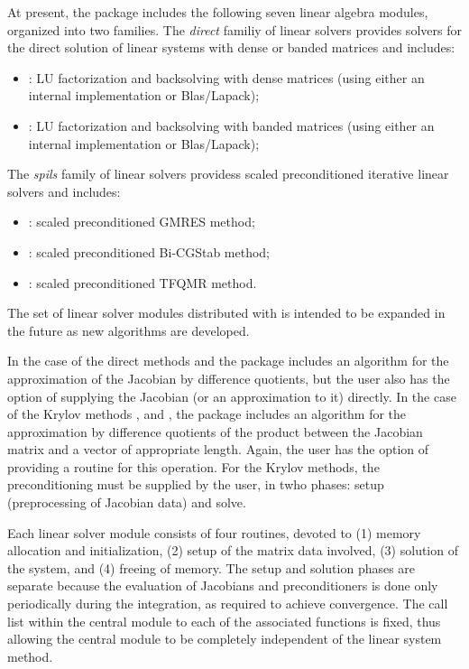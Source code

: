 At present, the package includes the following seven {\kinsol} linear algebra
modules, organized into two families. The {\em direct} familiy of linear
solvers provides solvers for the direct solution of linear systems with
dense or banded matrices and includes:
\begin{itemize} 
\item {\kindense}: LU factorization and backsolving with dense matrices
  (using either an internal implementation or Blas/Lapack); 
\item {\kinband}: LU factorization and backsolving with banded matrices
  (using either an internal implementation or Blas/Lapack); 
\end{itemize}
The {\em spils} family of linear solvers providess scaled preconditioned
iterative linear solvers and includes:
\begin{itemize} 
\item {\kinspgmr}: scaled preconditioned GMRES method;
\item {\kinspbcg}: scaled preconditioned Bi-CGStab method;
\item {\kinsptfqmr}: scaled preconditioned TFQMR method.
\end{itemize}
The set of linear solver modules distributed with {\kinsol} is intended to be expanded in the
future as new algorithms are developed.

In the case of the direct methods {\kindense} and {\kinband}
the package includes an algorithm for the approximation of the Jacobian by difference quotients, but
the user also has the option of supplying the Jacobian (or an approximation to it)
directly. In the case of the Krylov methods {\kinspgmr}, {\kinspbcg} and {\kinsptfqmr},
the package includes an algorithm for the approximation by difference quotients of the
product between the Jacobian matrix and a vector of appropriate length. Again, the user
has the option of providing a routine for this operation.
For the Krylov methods, 
the preconditioning must be supplied by the user, in twho phases:
setup (preprocessing of Jacobian data) and solve.

Each {\kinsol} linear solver module consists of four routines, devoted to (1)
memory allocation and initialization, (2) setup of the matrix data
involved, (3) solution of the system, and (4) freeing of memory.
The setup and solution phases are separate because the evaluation of
Jacobians and preconditioners is done only periodically during the
integration, as required to achieve convergence. The call list within
the central {\kinsol} module to each of the associated functions is
fixed, thus allowing the central module to be completely independent
of the linear system method.

